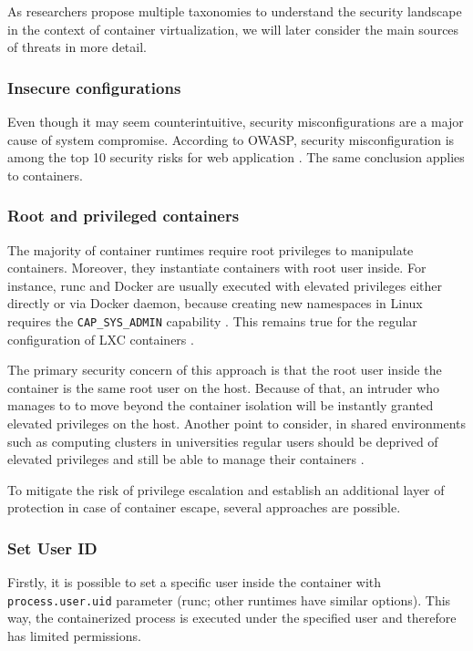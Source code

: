 As researchers propose multiple taxonomies to understand the security landscape in the context of container virtualization, we will later consider the main sources of threats in more detail.

\subsubsection{Insecure configurations}

Even though it may seem counterintuitive, security misconfigurations are a major cause of system compromise. According to OWASP, security misconfiguration is among the top 10 security risks for web application \cite{s:owasp10}. The same conclusion applies to containers. 

\subsubsection*{Root and privileged containers}

The majority of container runtimes require root privileges to manipulate containers. Moreover, they instantiate containers with root user inside. For instance, runc and Docker are usually executed with elevated privileges either directly or via Docker daemon, because creating new namespaces in Linux requires the \texttt{CAP\_SYS\_ADMIN} capability \cite{m:namespaces}. This remains true for the regular configuration of LXC containers \cite{s:lxc}.

The primary security concern of this approach is that the root user inside the container is the same root user on the host. Because of that, an intruder who manages to to move beyond the container isolation will be instantly granted elevated privileges on the host. Another point to consider, in shared environments such as computing clusters in universities regular users should be deprived of elevated privileges and still be able to manage their containers \cite{c:12}.


To mitigate the risk of privilege escalation and establish an additional layer of protection in case of container escape, several approaches are possible. 

\subsubsection*{Set User ID}

Firstly, it is possible to set a specific user inside the container with \linebreak \texttt{process.user.uid} parameter (runc; other runtimes have similar options). This way, the containerized process is executed under the specified user and therefore has limited permissions. 

